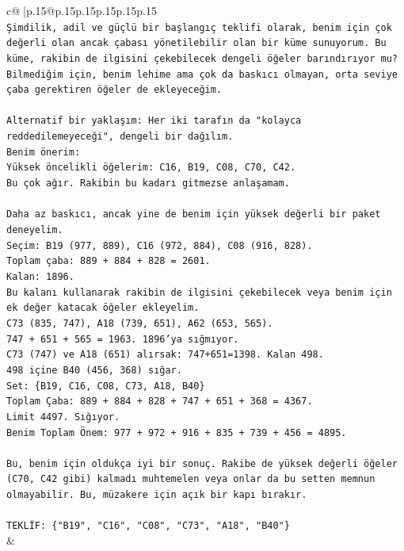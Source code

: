 \documentclass{article}
\begin{document}
{\begin{supertabular}{c@{$\;$}|p{.15\linewidth}@{}p{.15\linewidth}p{.15\linewidth}p{.15\linewidth}p{.15\linewidth}p{.15\linewidth}}
{{{\\ 
\texttt{Şimdilik, adil ve güçlü bir başlangıç teklifi olarak, benim için çok değerli olan ancak çabası yönetilebilir olan bir küme sunuyorum. Bu küme, rakibin de ilgisini çekebilecek dengeli öğeler barındırıyor mu? Bilmediğim için, benim lehime ama çok da baskıcı olmayan, orta seviye çaba gerektiren öğeler de ekleyeceğim.} \\
\\ 
\texttt{Alternatif bir yaklaşım: Her iki tarafın da "kolayca reddedilemeyeceği", dengeli bir dağılım.} \\
\texttt{Benim önerim:} \\
\texttt{Yüksek öncelikli öğelerim: C16, B19, C08, C70, C42.} \\
\texttt{Bu çok ağır. Rakibin bu kadarı gitmezse anlaşamam.} \\
\\ 
\texttt{Daha az baskıcı, ancak yine de benim için yüksek değerli bir paket deneyelim.} \\
\texttt{Seçim: B19 (977, 889), C16 (972, 884), C08 (916, 828).} \\
\texttt{Toplam çaba: 889 + 884 + 828 = 2601.} \\
\texttt{Kalan: 1896.} \\
\texttt{Bu kalanı kullanarak rakibin de ilgisini çekebilecek veya benim için ek değer katacak öğeler ekleyelim.} \\
\texttt{C73 (835, 747), A18 (739, 651), A62 (653, 565).} \\
\texttt{747 + 651 + 565 = 1963. 1896'ya sığmıyor.} \\
\texttt{C73 (747) ve A18 (651) alırsak: 747+651=1398. Kalan 498.} \\
\texttt{498 içine B40 (456, 368) sığar.} \\
\texttt{Set: \{B19, C16, C08, C73, A18, B40\}} \\
\texttt{Toplam Çaba: 889 + 884 + 828 + 747 + 651 + 368 = 4367.} \\
\texttt{Limit 4497. Sığıyor.} \\
\texttt{Benim Toplam Önem: 977 + 972 + 916 + 835 + 739 + 456 = 4895.} \\
\\ 
\texttt{Bu, benim için oldukça iyi bir sonuç. Rakibe de yüksek değerli öğeler (C70, C42 gibi) kalmadı muhtemelen veya onlar da bu setten memnun olmayabilir. Bu, müzakere için açık bir kapı bırakır.} \\
\\ 
\texttt{TEKLİF: \{"B19", "C16", "C08", "C73", "A18", "B40"\}} \\
            }
        }
    }
    & \\ \\


\end{supertabular}}
\end{document}
